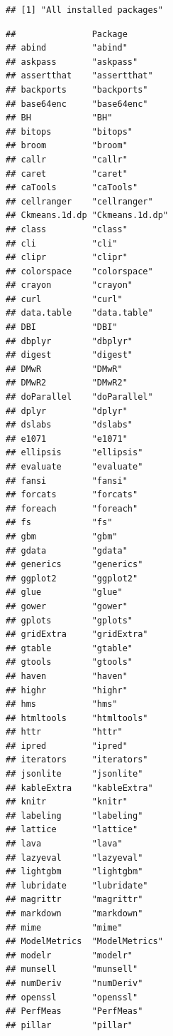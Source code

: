 \documentclass[]{article}
\begin{document}
\begin{verbatim}
## [1] "All installed packages"
\end{verbatim}

\begin{verbatim}
##               Package        
## abind         "abind"        
## askpass       "askpass"      
## assertthat    "assertthat"   
## backports     "backports"    
## base64enc     "base64enc"    
## BH            "BH"           
## bitops        "bitops"       
## broom         "broom"        
## callr         "callr"        
## caret         "caret"        
## caTools       "caTools"      
## cellranger    "cellranger"   
## Ckmeans.1d.dp "Ckmeans.1d.dp"
## class         "class"        
## cli           "cli"          
## clipr         "clipr"        
## colorspace    "colorspace"   
## crayon        "crayon"       
## curl          "curl"         
## data.table    "data.table"   
## DBI           "DBI"          
## dbplyr        "dbplyr"       
## digest        "digest"       
## DMwR          "DMwR"         
## DMwR2         "DMwR2"        
## doParallel    "doParallel"   
## dplyr         "dplyr"        
## dslabs        "dslabs"       
## e1071         "e1071"        
## ellipsis      "ellipsis"     
## evaluate      "evaluate"     
## fansi         "fansi"        
## forcats       "forcats"      
## foreach       "foreach"      
## fs            "fs"           
## gbm           "gbm"          
## gdata         "gdata"        
## generics      "generics"     
## ggplot2       "ggplot2"      
## glue          "glue"         
## gower         "gower"        
## gplots        "gplots"       
## gridExtra     "gridExtra"    
## gtable        "gtable"       
## gtools        "gtools"       
## haven         "haven"        
## highr         "highr"        
## hms           "hms"          
## htmltools     "htmltools"    
## httr          "httr"         
## ipred         "ipred"        
## iterators     "iterators"    
## jsonlite      "jsonlite"     
## kableExtra    "kableExtra"   
## knitr         "knitr"        
## labeling      "labeling"     
## lattice       "lattice"      
## lava          "lava"         
## lazyeval      "lazyeval"     
## lightgbm      "lightgbm"     
## lubridate     "lubridate"    
## magrittr      "magrittr"     
## markdown      "markdown"     
## mime          "mime"         
## ModelMetrics  "ModelMetrics" 
## modelr        "modelr"       
## munsell       "munsell"      
## numDeriv      "numDeriv"     
## openssl       "openssl"      
## PerfMeas      "PerfMeas"     
## pillar        "pillar"       

\end{verbatim}
\end{document}
